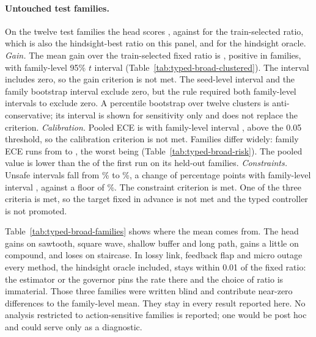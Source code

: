 \documentclass[10pt]{article}
\begin{document}
\paragraph{Untouched test families.}
On the twelve test families the head scores \TypedBroadTestOodBayesUtility{}, against \TypedBroadTestOodTrainFixedUtility{} for the train-selected ratio, which is also the hindsight-best ratio on this panel, and \TypedBroadTestOodOracleUtility{} for the hindsight oracle. \emph{Gain.} The mean gain over the train-selected fixed ratio is \TypedBroadTestOodBayesVsTrain{}, positive in \TypedBroadTestOodBayesVsTrainPositive{} families, with family-level 95\% $t$ interval \TypedBroadTestOodBayesVsTrainT{} (Table~\ref{tab:typed-broad-clustered}). The interval includes zero, so the gain criterion is not met. The seed-level interval \TypedBroadTestOodBayesVsTrainSeed{} and the family bootstrap interval \TypedBroadTestOodBayesVsTrainFamily{} exclude zero, but the rule required both family-level intervals to exclude zero. A percentile bootstrap over twelve clusters is anti-conservative; its interval is shown for sensitivity only and does not replace the criterion. \emph{Calibration.} Pooled ECE is \TypedBroadTestOodBayesEce{} with family-level interval \TypedBroadTestOodBayesEceFamily{}, above the 0.05 threshold, so the calibration criterion is not met. Families differ widely: family ECE runs from \TypedBroadTestOodBayesBestEce{} to \TypedBroadTestOodBayesWorstEce{}, the worst being \TypedBroadTestOodBayesWorstFamily{} (Table~\ref{tab:typed-broad-risk}). The pooled value is lower than the \TypedAuditOodBayesEce{} of the first run on its held-out families. \emph{Constraints.} Unsafe intervals fall from \TypedBroadTestOodTrainFixedUnsafe\% to \TypedBroadTestOodBayesUnsafe\%, a change of \TypedBroadTestOodBayesUnsafeVsTrain{} percentage points with family-level interval \TypedBroadTestOodBayesUnsafeVsTrainFamily{}, against a floor of \TypedBroadTestOodFloor\%. The constraint criterion is met. One of the three criteria is met, so the target fixed in advance is not met and the typed controller is not promoted.

Table~\ref{tab:typed-broad-families} shows where the mean comes from. The head gains on sawtooth, square wave, shallow buffer and long path, gains a little on compound, and loses on staircase. In lossy link, feedback flap and micro outage every method, the hindsight oracle included, stays within 0.01 of the fixed ratio: the estimator or the governor pins the rate there and the choice of ratio is immaterial. Those three families were written blind and contribute near-zero differences to the family-level mean. They stay in every result reported here. No analysis restricted to action-sensitive families is reported; one would be post hoc and could serve only as a diagnostic.
\end{document}
